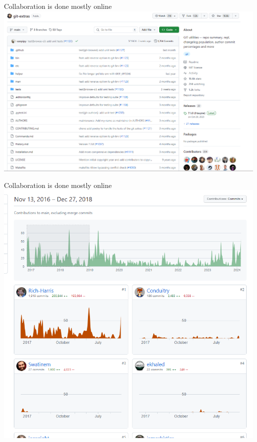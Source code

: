 \documentclass[
  ignorenonframetext,
  aspectratio=1610,
]{beamer}
\begin{document}
\begin{frame}{Collaboration is done mostly online}
\protect\hypertarget{collaboration-is-done-mostly-online}{}
\includegraphics{images/github-example.png}
\end{frame}

\begin{frame}{Collaboration is done mostly online}
\protect\hypertarget{collaboration-is-done-mostly-online-1}{}
\includegraphics{images/collab-example-2017-19.png}
\end{frame}
\end{document}
